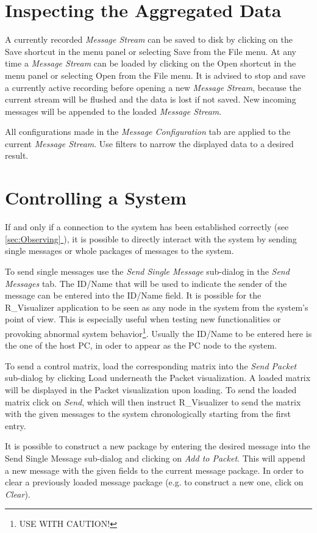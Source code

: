 \documentclass[12pt,a4paper]{scrartcl}
\newcommand*{\fullref}[1]{\hyperref[{#1}]{\autoref*{#1} \nameref*{#1}}} %
\begin{document}
\section{Inspecting the Aggregated Data}
\label{sec:Inspecting}
A currently recorded \textit{Message Stream} can be saved to disk by clicking on the Save shortcut in the menu panel or selecting Save from the File menu. At any time a \textit{Message Stream} can be loaded by clicking on the Open shortcut in the menu panel or selecting Open from the File menu. It is advised to stop and save a currently active recording before opening a new \textit{Message Stream}, because the current stream will be flushed and the data is lost if not saved. New incoming messages will be appended to the loaded \textit{Message Stream}.

All configurations made in the \textit{Message Configuration} tab are applied to the current \textit{Message Stream}. Use filters to narrow the displayed data to a desired result.

\FloatBarrier
\section{Controlling a System}
\label{sec:Controlling}
If and only if a connection to the system has been established correctly (see \fullref{sec:Observing}), it is possible to directly interact with the system by sending single messages or whole packages of messages to the system.

To send single messages use the \textit{Send Single Message} sub-dialog in the \textit{Send Messages} tab. The ID/Name that will be used to indicate the sender of the message can be entered into the ID/Name field. It is possible for the R\_Visualizer application to be seen as any node in the system from the system's point of view. This is especially useful when testing new functionalities or provoking abnormal system behavior\footnote{USE WITH CAUTION!}. Usually the ID/Name to be entered here is the one of the host PC, in oder to appear as the PC node to the system.

To send a control matrix, load the corresponding matrix into the \textit{Send Packet} sub-dialog by clicking Load underneath the Packet visualization. A loaded matrix will be displayed in the Packet visualization upon loading. To send the loaded matrix click on \textit{Send}, which will then instruct R\_Visualizer to send the matrix with the given messages to the system chronologically starting from the first entry.

It is possible to construct a new package by entering the desired message into the Send Single Message sub-dialog and clicking on \textit{Add to Packet}. This will append a new message with the given fields to the current message package. In order to clear a previously loaded message package (e.g. to construct a new one, click on \textit{Clear}).

\FloatBarrier
\newpage
\listoffigures
\end{document}
